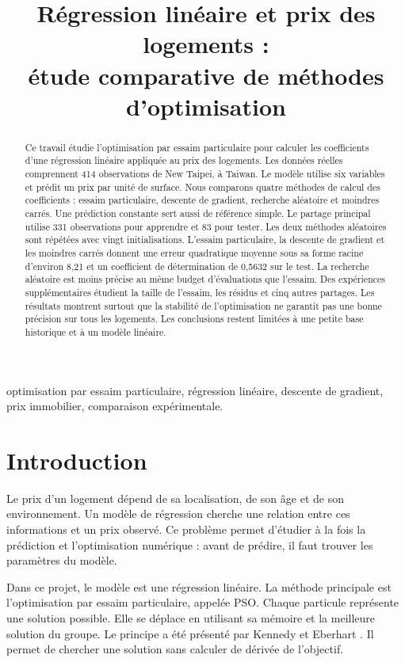 \documentclass[conference,a4paper]{IEEEtran}
\title{Régression linéaire et prix des logements :\\étude comparative de méthodes d'optimisation}
\author{\IEEEauthorblockN{\AuteurUn\ et\ \AuteurDeux}
\IEEEauthorblockA{Master 1 -- Optimisation numérique\\Projet SAM -- Année universitaire 2026--2027\\Enseignant : \Enseignant}}
\begin{document}
\maketitle
\begin{abstract}
Ce travail étudie l'optimisation par essaim particulaire pour calculer les coefficients d'une régression linéaire appliquée au prix des logements. Les données réelles comprennent 414 observations de New Taipei, à Taiwan. Le modèle utilise six variables et prédit un prix par unité de surface. Nous comparons quatre méthodes de calcul des coefficients : essaim particulaire, descente de gradient, recherche aléatoire et moindres carrés. Une prédiction constante sert aussi de référence simple. Le partage principal utilise 331 observations pour apprendre et 83 pour tester. Les deux méthodes aléatoires sont répétées avec vingt initialisations. L'essaim particulaire, la descente de gradient et les moindres carrés donnent une erreur quadratique moyenne sous sa forme racine d'environ 8,21 et un coefficient de détermination de 0,5632 sur le test. La recherche aléatoire est moins précise au même budget d'évaluations que l'essaim. Des expériences supplémentaires étudient la taille de l'essaim, les résidus et cinq autres partages. Les résultats montrent surtout que la stabilité de l'optimisation ne garantit pas une bonne précision sur tous les logements. Les conclusions restent limitées à une petite base historique et à un modèle linéaire.
\end{abstract}
\begin{IEEEkeywords}optimisation par essaim particulaire, régression linéaire, descente de gradient, prix immobilier, comparaison expérimentale.\end{IEEEkeywords}

\section{Introduction}
Le prix d'un logement dépend de sa localisation, de son âge et de son environnement. Un modèle de régression cherche une relation entre ces informations et un prix observé. Ce problème permet d'étudier à la fois la prédiction et l'optimisation numérique : avant de prédire, il faut trouver les paramètres du modèle.

Dans ce projet, le modèle est une régression linéaire. La méthode principale est l'optimisation par essaim particulaire, appelée PSO. Chaque particule représente une solution possible. Elle se déplace en utilisant sa mémoire et la meilleure solution du groupe. Le principe a été présenté par Kennedy et Eberhart \cite{kennedy}. Il permet de chercher une solution sans calculer de dérivée de l'objectif.
\end{document}
